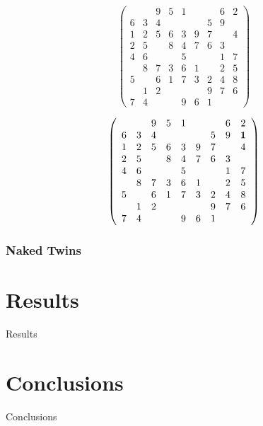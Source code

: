 \documentclass{article}
\begin{document}
\[ \left( \begin{array}{ccccccccc}
  &   & 9 & 5 & 1 &   &   & 6 & 2 \\
6 & 3 & 4 &   &   &   & 5 & 9 &   \\
1 & 2 & 5 & 6 & 3 & 9 & 7 &   & 4 \\
2 & 5 &   & 8 & 4 & 7 & 6 & 3 &   \\
4 & 6 &   &   & 5 &   &   & 1 & 7 \\
  & 8 & 7 & 3 & 6 & 1 &   & 2 & 5 \\
5 &   & 6 & 1 & 7 & 3 & 2 & 4 & 8 \\
  & 1 & 2 &   &   &   & 9 & 7 & 6 \\
7 & 4 &   &   & 9 & 6 & 1 &   &   \end{array}  \right)\]

\[ \left( \begin{array}{ccccccccc}
  &   & 9 & 5 & 1 &   &   & 6 & 2 \\
6 & 3 & 4 &   &   &   & 5 & 9 & {\bf 1} \\
1 & 2 & 5 & 6 & 3 & 9 & 7 &   & 4 \\
2 & 5 &   & 8 & 4 & 7 & 6 & 3 &   \\
4 & 6 &   &   & 5 &   &   & 1 & 7 \\
  & 8 & 7 & 3 & 6 & 1 &   & 2 & 5 \\
5 &   & 6 & 1 & 7 & 3 & 2 & 4 & 8 \\
  & 1 & 2 &   &   &   & 9 & 7 & 6 \\
7 & 4 &   &   & 9 & 6 & 1 &   &   \end{array}  \right)\]

\subsubsection{Naked Twins}

\section{Results}

Results

\section{Conclusions}

Conclusions



\end{document}
